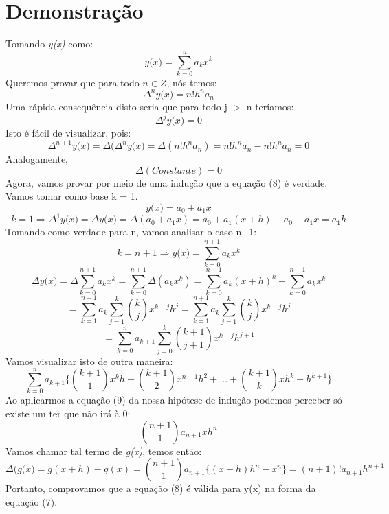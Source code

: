 \documentclass{article}
\begin{document}
\section{Demonstração}
    Tomando \textit{y(x)} como:
    \begin{equation}
        \textit{y(x)} = \sum_{k = 0}^{n} a_k x^k
    \end{equation}
    Queremos provar que para todo \(n \in Z\), nós temos:
    \begin{equation}
        \Delta^n\textit{y(x)} = n!h^n a_n
    \end{equation}
    Uma rápida consequência disto seria que para todo j \(>\) n teríamos:
    \begin{equation}
        \Delta^j\textit{y(x)} = 0
    \end{equation}
    Isto é fácil de visualizar, pois:
    \[\Delta^{n+1}\textit{y(x)} = \Delta(\Delta^n\textit{y(x)} = \Delta(n!h^na_n) = n!h^na_n - n!h^na_n = 0\]
    Analogamente,
    \[\Delta(Constante) = 0\]
    Agora, vamos provar por meio de uma indução que a equação (8) é verdade. Vamos tomar como base k = 1.
    \[ \textit{y(x)} = a_0 + a_1x\]
    \[k = 1 \Longrightarrow \Delta^1\textit{y(x)} = \Delta\textit{y(x)} = \Delta(a_0+a_1x) = a_0 + a_1(x+h) - a_0 - a_1x = a_1h\]
    Tomando como verdade para n, vamos analisar o caso n+1:
    \[k = n+1 \Longrightarrow \textit{y(x)} = \sum_{k = 0}^{n+1} a_k x^k\]
    \[\Delta\textit{y(x)} = \Delta\sum_{k = 0}^{n+1} a_k x^k = \sum_{k = 0}^{n+1} \Delta(a_kx^k) = \sum_{k = 0}^{n+1} a_k(x+h)^k - \sum_{k = 0}^{n+1} a_kx^k\]
    \[= \sum_{k = 1}^{n+1} a_k\sum_{j = 1}^{k} {k \choose j}x^{k-j}h^j = \sum_{k = 1}^{n+1} a_k\sum_{j = 1}^{k} {k \choose j}x^{k-j}h^j\]
    \[= \sum_{k = 0}^{n} a_{k+1}\sum_{j = 0}^{k} {k+1 \choose j+1}x^{k-j}h^{j+1}\]
    Vamos visualizar isto de outra maneira:
    \[\sum_{k = 0}^{n} a_{k+1}\{{k+1 \choose 1}x^kh + {k+1 \choose 2} x^{n-1}h^{2}+...+ {k+1 \choose k}xh^k+h^{k+1}\}\]
    Ao aplicarmos a equação (9) da nossa hipótese de indução podemos perceber só existe um ter que não irá à 0:
    \[{n+1 \choose 1}a_{n+1}xh^n\]
    Vamos chamar tal termo de \textit{g(x)}, temos então:
    \[\Delta(\textit{g(x)} = g(x+h) - g(x) = {n+1 \choose 1} a_{n+1} \{(x+h)h^n - x^n\} = (n+1)!a_{n+1}h^{n+1}\]
    Portanto, comprovamos que a equação (8) é válida para y(x) na forma da equação (7).
\end{document}
